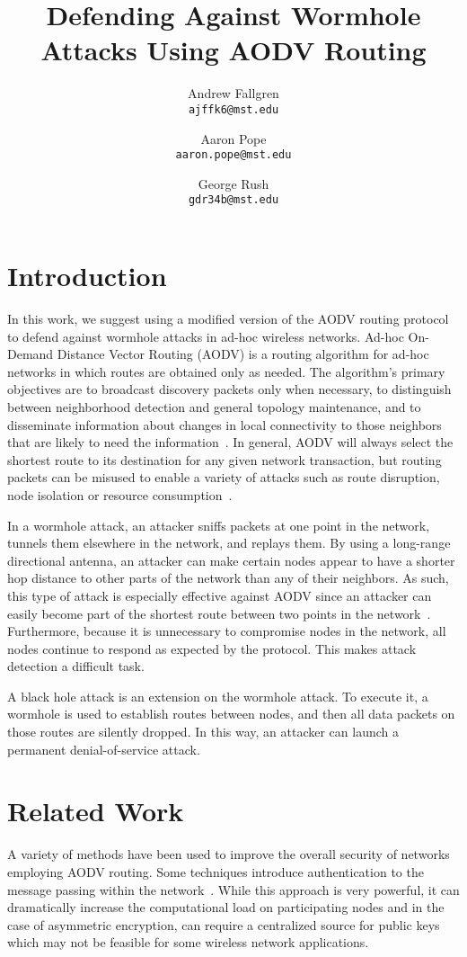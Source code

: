 \documentclass[12pt,a4paper]{report}
\author{
    Andrew Fallgren \\
    \texttt{ajffk6@mst.edu}
    \and
    Aaron Pope \\
    \texttt{aaron.pope@mst.edu}
    \and
    George Rush \\
    \texttt{gdr34b@mst.edu}
}
\title{Defending Against Wormhole Attacks Using AODV Routing}
\begin{document}
\maketitle

\pagebreak
\section{Introduction}
In this work, we suggest using a modified version of the AODV routing protocol to defend against wormhole attacks in ad-hoc wireless networks. Ad-hoc On-Demand Distance Vector Routing (AODV) is a routing algorithm for ad-hoc networks in which routes are obtained only as needed. The algorithm's primary objectives are to broadcast discovery packets only when necessary, to distinguish between neighborhood detection and general topology maintenance, and to disseminate information about changes in local connectivity to those neighbors that are likely to need the information~\cite{749281}. In general, AODV will always select the shortest route to its destination for any given network transaction, but routing packets can be misused to enable a variety of attacks such as route disruption, node isolation or resource consumption~\cite{Ning2005795}.

In a wormhole attack, an attacker sniffs packets at one point in the network, tunnels them elsewhere in the network, and replays them. By using a long-range directional antenna, an attacker can make certain nodes appear to have a shorter hop distance to other parts of the network than any of their neighbors. As such, this type of attack is especially effective against AODV since an attacker can easily become part of the shortest route between two points in the network~\cite{1589115}. Furthermore, because it is unnecessary to compromise nodes in the network, all nodes continue to respond as expected by the protocol. This makes attack detection a difficult task.

A black hole attack is an extension on the wormhole attack. To execute it, a wormhole is used to establish routes between nodes, and then all data packets on those routes are silently dropped. In this way, an attacker can launch a permanent denial-of-service attack.

\section{Related Work}
A variety of methods have been used to improve the overall security of networks employing AODV routing. Some techniques introduce authentication to the message passing within the network~\cite{Hu:2005:ASO:1160100.1160103, 1181388, 806983}. While this approach is very powerful, it can dramatically increase the computational load on participating nodes and in the case of asymmetric encryption, can require a centralized source for public keys which may not be feasible for some wireless network applications.
\end{document}
